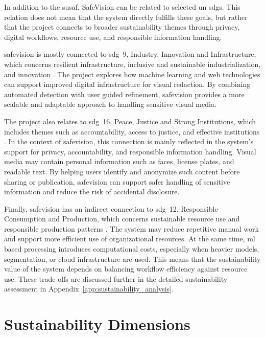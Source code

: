 In addition to the \acrshort{susaf}, SafeVision can be related to selected \acrshort{un} \acrshort{sdg}s. This relation does not mean that the system directly fulfills these goals, but rather that the project connects to broader sustainability themes through privacy, digital workflows, resource use, and responsible information handling.

\gls{safevision} is mostly connected to \acrshort{sdg}~9, Industry, Innovation and Infrastructure, which concerns resilient infrastructure, inclusive and sustainable industrialization, and innovation \cite{un_sdg9}. The project explores how machine learning and web technologies can support improved digital infrastructure for visual redaction. By combining automated detection with user guided refinement, \gls{safevision} provides a more scalable and adaptable approach to handling sensitive visual media.

The project also relates to \acrshort{sdg}~16, Peace, Justice and Strong Institutions, which includes themes such as accountability, access to justice, and effective institutions \cite{un_sdg16}. In the context of \gls{safevision}, this connection is mainly reflected in the system's support for privacy, accountability, and responsible information handling. Visual media may contain personal information such as faces, license plates, and readable text. By helping users identify and anonymize such content before sharing or publication, \gls{safevision} can support safer handling of sensitive information and reduce the risk of accidental disclosure.

Finally, \gls{safevision} has an indirect connection to \acrshort{sdg}~12, Responsible Consumption and Production, which concerns sustainable resource use and responsible production patterns \cite{un_sdg12}. The system may reduce repetitive manual work and support more efficient use of organizational resources. At the same time, \acrshort{ml} based processing introduces computational costs, especially when heavier models, segmentation, or cloud infrastructure are used. This means that the sustainability value of the system depends on balancing workflow efficiency against resource use. These trade offs are discussed further in the detailed sustainability assessment in Appendix~\ref{app:sustainability_analysis}.


\section{Sustainability Dimensions}
\label{sec:susaf_dimensions}

